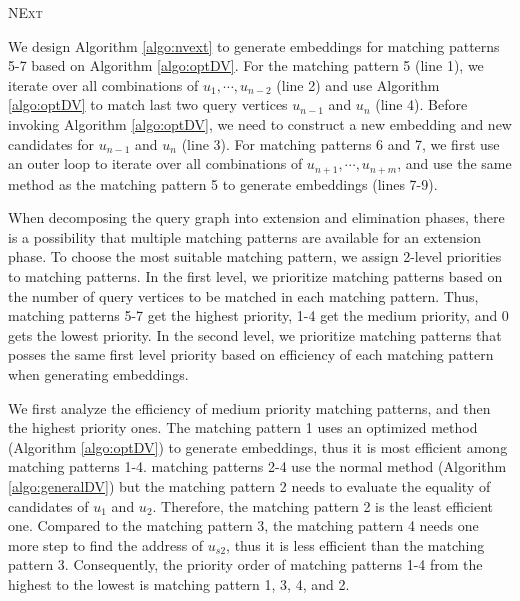 \begin{algorithm}
	\caption{\textsc{NExt}}
	\label{algo:nvext}
\end{algorithm}

We design Algorithm \ref{algo:nvext} to generate embeddings for matching patterns 5-7 based on Algorithm \ref{algo:optDV}. For the matching pattern 5 (line 1), we iterate over all combinations of $u_1, \cdots, u_{n-2}$ (line 2) and use Algorithm \ref{algo:optDV} to match last two query vertices $u_{n-1}$ and $u_n$ (line 4). Before invoking Algorithm \ref{algo:optDV}, we need to construct a new embedding and new candidates for $u_{n-1}$ and $u_n$ (line 3). For matching patterns 6 and 7, we first use an outer loop to iterate over all combinations of $u_{n+1}, \cdots, u_{n+m}$, and use the same method as the matching pattern 5 to generate embeddings (lines 7-9).

When decomposing the query graph into extension and elimination phases, there is a possibility that multiple matching patterns are available for an extension phase. To choose the most suitable matching pattern, we assign 2-level priorities to matching patterns. In the first level, we prioritize matching patterns based on the number of query vertices to be matched in each matching pattern. Thus, matching patterns 5-7 get the highest priority, 1-4 get the medium priority, and 0 gets the lowest priority. In the second level, we prioritize matching patterns that posses the same first level priority based on efficiency of each matching pattern when generating embeddings.

We first analyze the efficiency of medium priority matching patterns, and then the highest priority ones. The matching pattern 1 uses an optimized method (Algorithm \ref{algo:optDV}) to generate embeddings, thus it is most efficient among matching patterns 1-4. matching patterns 2-4 use the normal method (Algorithm \ref{algo:generalDV}) but the matching pattern 2 needs to evaluate the equality of candidates of $u_1$ and $u_2$. Therefore, the matching pattern 2 is the least efficient one. Compared to the matching pattern 3, the matching pattern 4 needs one more step to find the address of $u_{s2}$, thus it is less efficient than the matching pattern 3. Consequently, the priority order of matching patterns 1-4 from the highest to the lowest is matching pattern 1, 3, 4, and 2.

